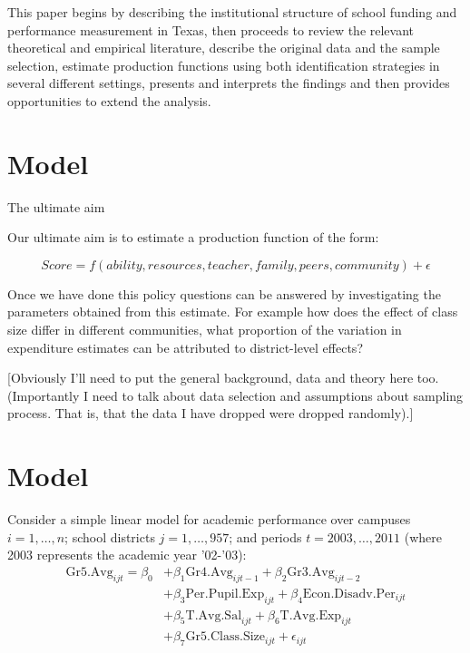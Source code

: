 \documentclass[11pt]{article}
\begin{document}
This paper begins by describing the institutional structure of school funding and performance measurement in Texas, then proceeds to review the relevant theoretical and empirical literature, describe the original data and the sample selection, estimate production functions using both identification strategies in several different settings, presents and interprets the findings and then provides opportunities to extend the analysis. 

\section{Model}
\label{s:next}




The ultimate aim


Our ultimate aim is to estimate a production function of the form:

$$Score = f(ability,resources,teacher,family,peers,community) + \epsilon$$

Once we have done this policy questions can be answered by investigating the parameters obtained from this estimate. For example how does the effect of class size differ in different communities, what proportion of the variation in expenditure estimates can be attributed to district-level effects?

[Obviously I'll need to put the general background, data and theory here too. (Importantly I need to talk about data selection and assumptions about sampling process. That is, that the data I have dropped were dropped randomly).]

\section{Model}
\label{s:next}


Consider a simple linear model for academic performance over campuses $i=1,\ldots,n$; school districts $j=1,\ldots,957$; and periods $t=2003,\ldots,2011$ (where 2003 represents the academic year '02-'03):
\begin{align*}
\mathrm{Gr5.Avg}_{ijt} = \beta_{0} 
    &+ \beta_{1}  \mathrm{Gr4.Avg}_{ijt-1} 
    + \beta_{2}  \mathrm{Gr3.Avg}_{ijt-2}    \\
    &+ \beta_{3}  \mathrm{Per.Pupil.Exp}_{ijt} 
    + \beta_{4}  \mathrm{Econ.Disadv.Per}_{ijt} \\
    &+ \beta_{5}  \mathrm{T.Avg.Sal}_{ijt}   
    + \beta_{6}  \mathrm{T.Avg.Exp}_{ijt}  \\
    &+ \beta_{7}  \mathrm{Gr5.Class.Size}_{ijt} + \epsilon_{ijt}
\end{align*}
\end{document}
